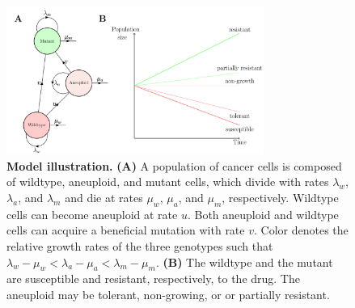 \documentclass[12pt]{extarticle}
\begin{document}
\begin{figure}
\centering
\includegraphics[width=0.75\textwidth]{Figures/figureAneuploidy.pdf}
\caption{
\textbf{Model illustration.}
\textbf{(A)} A population of cancer cells is composed of wildtype, aneuploid, and mutant cells, which divide with rates $\lambda_w$, $\lambda_a$, and $\lambda_m$ and die at rates $\mu_w$, $\mu_a$, and $\mu_m$, respectively. 
Wildtype cells can become aneuploid at rate $u$. Both aneuploid and wildtype cells can acquire a beneficial mutation with rate $v$. Color denotes the relative growth rates of the three genotypes such that $\lambda_w - \mu_w < \lambda_a - \mu_a < \lambda_m - \mu_m$. \textbf{(B)} The wildtype and the mutant are susceptible and resistant, respectively, to the drug. The aneuploid may be tolerant, non-growing, or or partially resistant.
}
\label{figureAneuploidy}
\end{figure}

\end{document}
